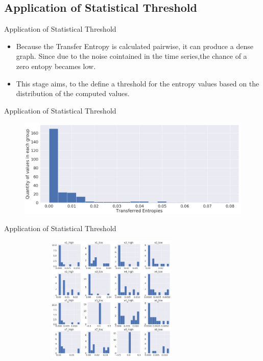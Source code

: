 \subsection{Application of Statistical Threshold}
\begin{frame}{Application of Statistical Threshold}

        \begin{itemize}
            
            \item {  Because the Transfer Entropy is calculated pairwise, it can produce a dense graph. Since due to the noise cointained in the time series,the chance of a zero entopy becames low.
            }
            \item { This stage aims, to the define a threshold for the entropy values based on the distribution of the computed values.}
        \end{itemize}
    

        
\end{frame}

\begin{frame}{Application of Statistical Threshold}
    \begin{figure}
        \includegraphics[width=\textwidth]{figuras/hist_ex.png}
    \end{figure}
\end{frame}

\begin{frame}{Application of Statistical Threshold}
    \begin{figure}
        \includegraphics[width=0.8\textwidth, height=60mm]{figuras/mult_hist.png}
    \end{figure}

\end{frame}

